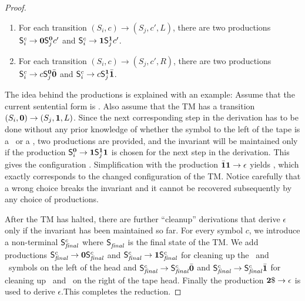 \documentclass[preprint, 9pt]{sigplanconf}
\begin{document}
\begin{proof}
\begin{enumerate}
\item For each transition  $(S_i, c) \rightarrow (S_j,c',L)$, there are
  two  productions $\mathsf{S}_{i}^{c}  \rightarrow  \mathbf{0} \mathsf{S}_{j}^{\mathbf{0}}c'$
  and $\mathsf{S}_{i}^{c} \rightarrow \mathbf{1} \mathsf{S}_{j}^{\mathbf{1}}c'$.
\item For each  transition $(S_i, c) \rightarrow (S_j,c',R)$, there
  are two productions
  $\mathsf{S}_{i}^{c} \rightarrow c \mathsf{S}_{j}^{\mathbf{0}}\bar{\mathbf{0}}$ and $\mathsf{S}_{i}^{c}
  \rightarrow c \mathsf{S}_{j}^{\mathbf{1}}\bar{\mathbf{1}}$. 
\end{enumerate}
The idea  behind the  productions is explained  with an
example:  Assume that  the current  sentential form  is
\bcar\bcdr{}\acar\acar. Also  assume that  the
TM  has  a   transition  $(S_i,\mathbf{0})  \rightarrow
(S_j,\mathbf{1}, L)$.  Since the next corresponding  step in
the  derivation  has  to  be  done  without  any  prior
knowledge of whether the symbol to the left of the tape
is a \acar\  or a \acdr, two  productions are provided,
and  the  invariant  will  be maintained  only  if  the
production         $\mathsf{S}_{i}^{\mathbf{0}}         \rightarrow
\mathbf{1}\mathsf{S}_{j}^{\mathbf{1}}\mathbf{1}$ is chosen  for the next step
in  the  derivation.    This  gives  the  configuration
\bcar\bcdr\acdr{}\acdr\acar\acar.
Simplification   with    the   production   $\bar{\mathbf{1}}\mathbf{1}
\rightarrow               \epsilon$              yields
\bcar{}\acdr\acar\acar,    which   exactly
corresponds  to   the  changed  configuration   of  the
TM.  Notice  carefully that a wrong  choice breaks
the invariant  and it cannot be  recovered subsequently
by any choice of productions.

After the  TM has  halted, there  are further  ``cleanup'' derivations
that derive  $\epsilon$ only if  the invariant has been  maintained so
far.    For   every   symbol   $c$,  we   introduce   a   non-terminal
$\mathsf{S}_{\mathit{final}}^{c}$  where   $\mathsf{S}_{\mathit{final}}^{}$  is  the
final state  of the  TM. We add  productions $\mathsf{S}_{\mathit{final}}^{c}
\rightarrow         \mathbf{0}        \mathsf{S}_{\mathit{final}}^{c}$         and
$\mathsf{S}_{\mathit{final}}^{c} \rightarrow  \mathbf{1} \mathsf{S}_{\mathit{final}}^{c}$
for cleaning up the \bcar\ and \bcdr\  symbols on the left of the head
and                $\mathsf{S}_{\mathit{final}}^{c}               \rightarrow
\mathsf{S}_{\mathit{final}}^{c}\bar{\mathbf{0}}$      and      $\mathsf{S}_{\mathit{final}}^{c}
\rightarrow \mathsf{S}_{\mathit{final}}^{c}\bar{\mathbf{1}}$ for  cleaning up \acar\ and
\acdr\ on the right of the tape head. Finally the production ${\mathbf{2}}\$
\rightarrow \epsilon$ is used  to derive $\epsilon$.This completes the
reduction.
\end{proof}
\end{document}
